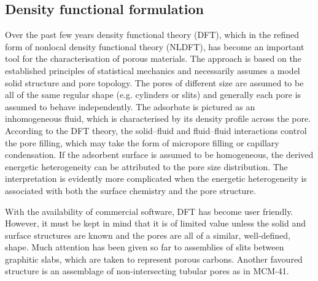 \documentclass[%
 reprint,
 amsmath,amssymb,
 aps,
10.5pt,
]{revtex4-1}
\begin{document}
\subsection{Density functional formulation}
Over the past few years density functional theory
(DFT), which in the refined form of nonlocal
density functional theory (NLDFT), has become
an important tool for the characterisation of
porous materials. The approach is based
on the established principles of statistical mechanics
and necessarily assumes a model solid structure
and pore topology. The pores of different size
are assumed to be all of the same regular shape
(e.g. cylinders or slits) and generally each pore is
assumed to behave independently. The adsorbate
is pictured as an inhomogeneous fluid, which is
characterised by its density profile across the pore.
According to the DFT theory, the solid–fluid and
fluid–fluid interactions control the pore filling,
which may take the form of micropore filling or
capillary condensation. If the adsorbent surface is
assumed to be homogeneous, the derived energetic
heterogeneity can be attributed to the pore
size distribution. The interpretation is evidently
more complicated when the energetic heterogeneity
is associated with both the surface chemistry
and the pore structure.

With the availability of commercial software,
DFT has become user friendly. However,
it must be kept in mind that it is of limited value
unless the solid and surface structures are known
and the pores are all of a similar, well-defined,
shape. Much attention has been given so far to
assemblies of slits between graphitic slabs, which
are taken to represent porous carbons.
Another favoured structure is an assemblage of
non-intersecting tubular pores as in MCM-41.




\end{document}
